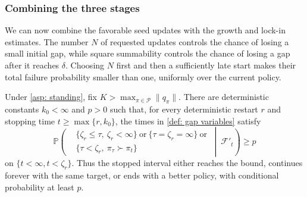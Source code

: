 \subsubsection{Combining the three stages}
We can now combine the favorable seed updates with the growth and lock-in estimates. The number $N$ of requested updates controls the chance of losing a small initial gap, while square summability controls the chance of losing a gap after it reaches $\delta$. Choosing $N$ first and then a sufficiently late start makes their total failure probability smaller than one, uniformly over the current policy.

\begin{lemma}
\label{thm: fixed prob that bad actions dont become greedy}
Under \autoref{asp: standing}, fix $K>\max_{\pi\in\mathcal P}\|q_\pi\|$. There are deterministic constants $k_0<\infty$ and $p>0$ such that, for every deterministic restart $r$ and stopping time $t\ge\max\{r,k_0\}$, the times in \autoref{def: gap variables} satisfy
\begin{equation}
\label{eq:progress}
\mathbb P\!\left(
\begin{aligned}
&\{\zeta_r\le\tau,\ \zeta_r<\infty\}\ \text{or}\ \{\tau=\zeta_r=\infty\}\ \text{or}\\
&\{\tau<\zeta_r,\ \pi_\tau\succ\pi_t\}
\end{aligned}
\ \middle|\ \mathcal F'_t\right)\ge p
\end{equation}
on $\{t<\infty,t<\zeta_r\}$. Thus the stopped interval either reaches the bound, continues forever with the same target, or ends with a better policy, with conditional probability at least $p$.
\end{lemma}
